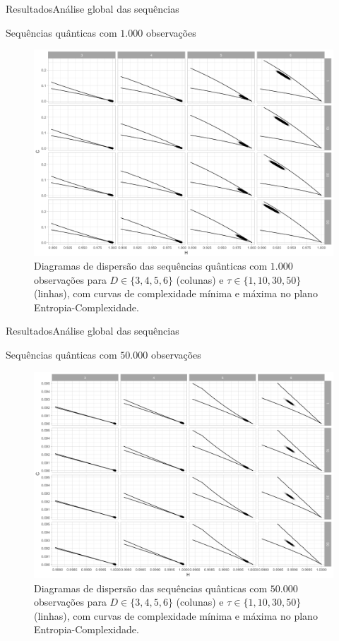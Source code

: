\documentclass[10pt,xcolor={dvipsnames}]{beamer}
\begin{document}
\begin{frame}{Resultados}{Análise global das sequências}
\begin{block}{Sequências quânticas com $1.000$ observações}
	\begin{figure}[hbt]
		\centering
		\includegraphics[width=.65\linewidth]{ScatterAll_Quant_1k}
		\caption{Diagramas de dispersão das sequências quânticas com $1.000$ observações para $D\in\{3, 4, 5, 6\}$ (colunas) e $\tau\in\{1, 10, 30, 50\}$ (linhas), com curvas de complexidade mínima e máxima no plano Entropia-Complexidade.}\label{Fig:ScatterAll_Quant_1k}
	\end{figure}
\end{block}
\end{frame}

\begin{frame}{Resultados}{Análise global das sequências}
\begin{block}{Sequências quânticas com $50.000$ observações}
	\begin{figure}[hbt]
		\centering
		\includegraphics[width=.65\linewidth]{ScatterAll_Quant_50k}
		\caption{Diagramas de dispersão das sequências quânticas com $50.000$ observações para $D\in\{3, 4, 5, 6\}$ (colunas) e $\tau\in\{1, 10, 30, 50\}$ (linhas), com curvas de complexidade mínima e máxima no plano Entropia-Complexidade.}\label{Fig:ScatterAll_Quant_50k}
	\end{figure}
\end{block}
\end{frame}
\end{document}
